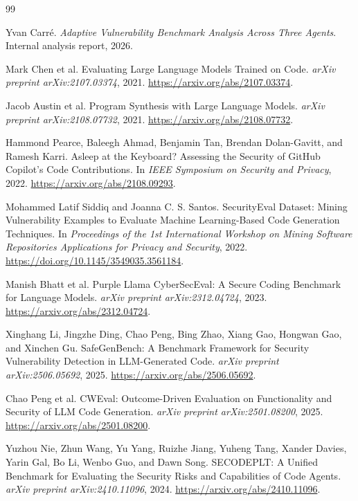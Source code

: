 \documentclass[11pt]{article}
\begin{document}
\begin{thebibliography}{99}


Yvan Carré.
\newblock \emph{Adaptive Vulnerability Benchmark Analysis Across Three Agents}.
\newblock Internal analysis report, 2026.

Mark Chen et al.
\newblock Evaluating Large Language Models Trained on Code.
\newblock \emph{arXiv preprint arXiv:2107.03374}, 2021.
\newblock \url{https://arxiv.org/abs/2107.03374}.

Jacob Austin et al.
\newblock Program Synthesis with Large Language Models.
\newblock \emph{arXiv preprint arXiv:2108.07732}, 2021.
\newblock \url{https://arxiv.org/abs/2108.07732}.

Hammond Pearce, Baleegh Ahmad, Benjamin Tan, Brendan Dolan-Gavitt, and Ramesh Karri.
\newblock Asleep at the Keyboard? Assessing the Security of GitHub Copilot's Code Contributions.
\newblock In \emph{IEEE Symposium on Security and Privacy}, 2022.
\newblock \url{https://arxiv.org/abs/2108.09293}.

Mohammed Latif Siddiq and Joanna C. S. Santos.
\newblock SecurityEval Dataset: Mining Vulnerability Examples to Evaluate Machine Learning-Based Code Generation Techniques.
\newblock In \emph{Proceedings of the 1st International Workshop on Mining Software Repositories Applications for Privacy and Security}, 2022.
\newblock \url{https://doi.org/10.1145/3549035.3561184}.

Manish Bhatt et al.
\newblock Purple Llama CyberSecEval: A Secure Coding Benchmark for Language Models.
\newblock \emph{arXiv preprint arXiv:2312.04724}, 2023.
\newblock \url{https://arxiv.org/abs/2312.04724}.

Xinghang Li, Jingzhe Ding, Chao Peng, Bing Zhao, Xiang Gao, Hongwan Gao, and Xinchen Gu.
\newblock SafeGenBench: A Benchmark Framework for Security Vulnerability Detection in LLM-Generated Code.
\newblock \emph{arXiv preprint arXiv:2506.05692}, 2025.
\newblock \url{https://arxiv.org/abs/2506.05692}.

Chao Peng et al.
\newblock CWEval: Outcome-Driven Evaluation on Functionality and Security of LLM Code Generation.
\newblock \emph{arXiv preprint arXiv:2501.08200}, 2025.
\newblock \url{https://arxiv.org/abs/2501.08200}.

Yuzhou Nie, Zhun Wang, Yu Yang, Ruizhe Jiang, Yuheng Tang, Xander Davies, Yarin Gal, Bo Li, Wenbo Guo, and Dawn Song.
\newblock SECODEPLT: A Unified Benchmark for Evaluating the Security Risks and Capabilities of Code Agents.
\newblock \emph{arXiv preprint arXiv:2410.11096}, 2024.
\newblock \url{https://arxiv.org/abs/2410.11096}.


\end{thebibliography}
\end{document}
